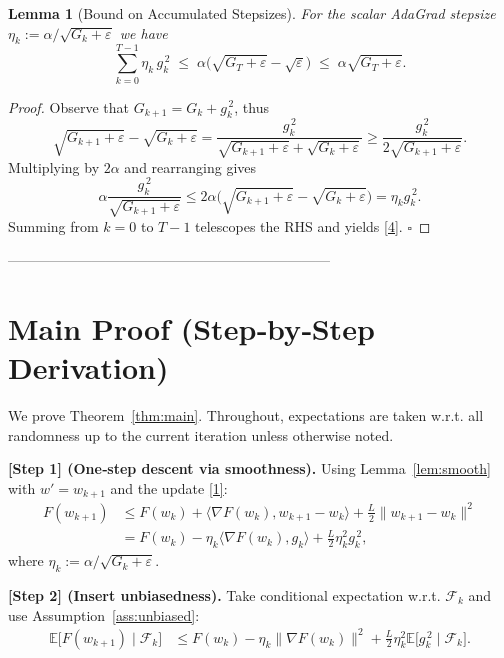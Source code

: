 \documentclass{article}
\newtheorem{lemma}{Lemma}
\newcommand{\E}{\mathbb{E}}
\begin{document}
\begin{lemma}[Bound on Accumulated Stepsizes]\label{lem:stepsize}
For the scalar AdaGrad stepsize $\eta_k:=\alpha/\sqrt{G_k+\varepsilon}$ we have
\[
\sum_{k=0}^{T-1}\eta_k\,g_k^{\,2}
\;\le\;
\alpha\bigl(\sqrt{G_T+\varepsilon}-\sqrt{\varepsilon}\bigr)
\;\le\;
\alpha\sqrt{G_T+\varepsilon}.
\tag{4}
\]
\end{lemma}
\begin{proof}
Observe that $G_{k+1}=G_k+g_k^{\,2}$, thus
\[
\sqrt{G_{k+1}+\varepsilon}-\sqrt{G_k+\varepsilon}
=\frac{g_k^{\,2}}{\sqrt{G_{k+1}+\varepsilon}+\sqrt{G_k+\varepsilon}}
\ge\frac{g_k^{\,2}}{2\sqrt{G_{k+1}+\varepsilon}} .
\]
Multiplying by $2\alpha$ and rearranging gives
\[
\alpha\frac{g_k^{\,2}}{\sqrt{G_{k+1}+\varepsilon}}
\le 2\alpha\bigl(\sqrt{G_{k+1}+\varepsilon}-\sqrt{G_k+\varepsilon}\bigr)
= \eta_k g_k^{\,2}.
\]
Summing from $k=0$ to $T-1$ telescopes the RHS and yields \eqref{4}. \hfill $\square$
\end{proof}

---------------------------------------------------------------------

\section*{Main Proof (Step‑by‑Step Derivation)}

We prove Theorem~\ref{thm:main}.  Throughout, expectations are taken w.r.t. all randomness up to the current iteration unless otherwise noted.

\bigskip
\noindent\textbf{[Step 1] (One‑step descent via smoothness).}  
Using Lemma~\ref{lem:smooth} with $w'=w_{k+1}$ and the update \eqref{1}:
\[
\begin{aligned}
F(w_{k+1})
&\le F(w_k)+\langle\nabla F(w_k),w_{k+1}-w_k\rangle
   +\frac{L}{2}\|w_{k+1}-w_k\|^2\\
&= F(w_k)-\eta_k\langle\nabla F(w_k),g_k\rangle
   +\frac{L}{2}\eta_k^{2}g_k^{\,2},
\end{aligned}
\tag{5}
\]
where $\eta_k:=\alpha/\sqrt{G_k+\varepsilon}$.

\bigskip
\noindent\textbf{[Step 2] (Insert unbiasedness).}  
Take conditional expectation w.r.t. $\mathcal{F}_k$ and use Assumption~\ref{ass:unbiased}:
\[
\begin{aligned}
\E\!\big[F(w_{k+1})\mid\mathcal{F}_k\big]
&\le F(w_k)-\eta_k\|\nabla F(w_k)\|^{2}
   +\frac{L}{2}\eta_k^{2}\E\!\big[g_k^{\,2}\mid\mathcal{F}_k\big].
\end{aligned}
\tag{6}
\]
\end{document}
